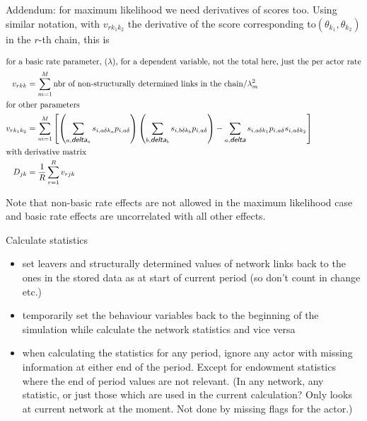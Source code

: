 \documentclass[12pt,a4paper]{article}
\makeatletter
\renewcommand{\=}{\,=\,}
\newcommand{\+}{\,+\,}
\newcommand{\nnm}[1]{\textsf{\small\textit{#1}}}
\renewcommand{\subsection}{\@startsection{subsection}{2}
                {0pt}{0.7\baselineskip}{0.3\baselineskip}
                {\sffamily} }
\makeatother
\begin{document}
Addendum: for maximum likelihood we need derivatives of scores too. Using
similar notation, with $v_{rk_1k_2}$ the derivative of the score corresponding
to$(\theta_{k_1}, \theta_{k_2})$  in the $r$-th chain,  this is

\begin{align*}
\intertext{for a basic rate parameter, $(\lambda)$, for a
dependent variable, not the total here, just the per actor rate}
v_{rkk} &= \sum_{m=1}^M  \textrm{nbr of non-structurally determined links in the
  chain}/ \lambda_m^2\\
\intertext{for other parameters}
v_{rk_1k_2}&= \sum_{m=1}^M \left [  \left( \sum_{a, \nnm{delta}_a}
  s_{i,a\delta k_a} p_{i,a\delta} \right) \left (
\sum_{ b, \nnm{delta}_b} s_{i,b\delta k_b} p_{i,a\delta} \right) -
\sum_{a, \nnm{delta}}
  s_{i,a\delta k_1}p_{i,a\delta}  s_{i,a\delta k_2}
\right ]\\
\intertext{with derivative matrix}
 D_{jk}&=\frac{1}{R}\sum_{r=1}^R v_{rjk}
\end{align*}

Note that non-basic rate effects are not allowed in the maximum likelihood
case and basic rate effects are uncorrelated with all other effects.

\subsection{Calculate statistics}
\label{sec:stats}
\begin{itemize}
\item set leavers and structurally determined values of
  network links back to the ones in the stored data as at
    start of current period (so don't count in change
  etc.)
\item temporarily set the behaviour variables back to the beginning
of the simulation while calculate the network statistics and vice
versa
\item when calculating the statistics for any period, ignore any actor with
  missing information at either end of the period. Except for endowment
  statistics where the end of period values are not relevant.  (In any network,
  any statistic, or just those which are used in the current calculation? Only
  looks at current network at the moment. Not done by missing flags for the
  actor.)
\end{itemize}
\end{document}
